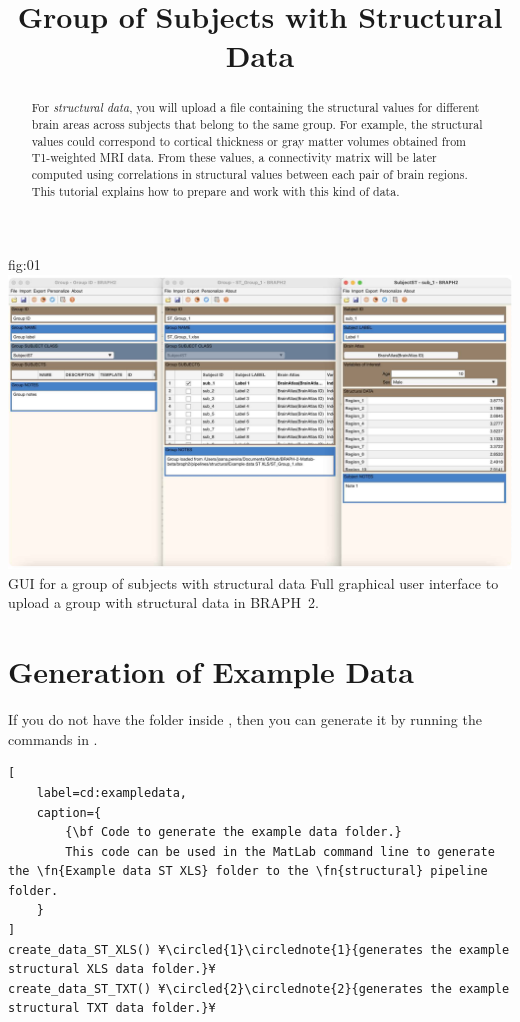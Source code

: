 \documentclass[justified]{tufte-handout}
\title{Group of Subjects with Structural Data}
\begin{document}
\maketitle

\begin{abstract}
\noindent
For \emph{structural data}, you will upload a file containing the structural values for different brain areas across subjects that belong to the same group. For example, the structural values could correspond to cortical thickness or gray matter volumes obtained from T1-weighted MRI data. From these values, a connectivity matrix will be later computed using correlations in structural values between each pair of brain regions. This tutorial explains how to prepare and work with this kind of data.
\end{abstract}

\tableofcontents

	{fig:01}
	{\includegraphics{fig01.jpg}}
	{GUI for a group of subjects with structural data}
	{
	Full graphical user interface to upload a group with structural data in BRAPH~2. 
	}

\clearpage
\section{Generation of Example Data}

If you do not have the  folder inside , then you can generate it by running the commands in .

\begin{lstlisting}[
	label=cd:exampledata,
	caption={
		{\bf Code to generate the example data folder.}
		This code can be used in the MatLab command line to generate the \fn{Example data ST XLS} folder to the \fn{structural} pipeline folder.
	}
]
create_data_ST_XLS() ¥\circled{1}\circlednote{1}{generates the example structural XLS data folder.}¥
create_data_ST_TXT() ¥\circled{2}\circlednote{2}{generates the example structural TXT data folder.}¥
\end{lstlisting}
\end{document}
